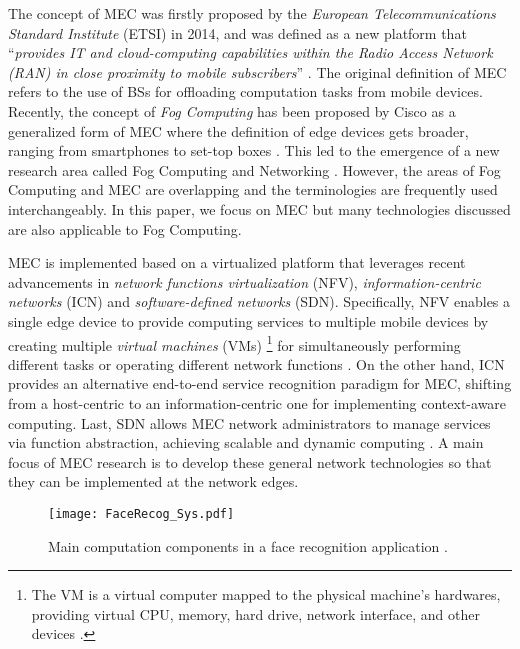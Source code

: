 \documentclass[journal]{IEEEtran}
\begin{document}
The concept of MEC was firstly proposed by the \emph{European Telecommunications Standard Institute} (ETSI) in 2014, and was defined as a new platform that ``\emph{provides IT and cloud-computing capabilities within the Radio Access Network (RAN) in close proximity to mobile subscribers}'' \cite{ETSI14}.  The original definition of MEC refers to the use of BSs for offloading computation tasks from mobile devices. Recently, the concept of \emph{Fog Computing} has been proposed by Cisco as a generalized form of MEC where the definition of edge devices gets broader, ranging from  smartphones to set-top boxes \cite{bonomi2012fog}.  This led to the emergence of a new research area called Fog Computing and Networking \cite{yi2015survey,chiangfog,klas2015fog}. However, the  areas of Fog Computing and MEC are overlapping and the terminologies are frequently used interchangeably. In this paper, we focus on MEC but many technologies discussed are also applicable to Fog Computing.

MEC is implemented based on a virtualized platform that leverages recent advancements in \emph{network functions virtualization} (NFV), \emph{information-centric networks} (ICN) and \emph{software-defined networks} (SDN). Specifically, NFV enables a single edge device to provide computing services to multiple mobile devices by creating multiple \emph{virtual machines} (VMs) \footnote{The VM is a virtual computer mapped to the physical machine's hardwares, providing virtual CPU, memory, hard drive, network interface, and other devices \cite{goldberg1974survey}. } for simultaneously performing different tasks or operating different network functions \cite{hu2015mobile}. On the other hand, ICN provides an alternative end-to-end service recognition paradigm for MEC, shifting from a host-centric to an information-centric one for implementing  context-aware computing. Last, SDN allows MEC network administrators to manage services via function abstraction, achieving scalable and dynamic computing \cite{chang2016mec}. A main focus of MEC research is to develop these general network technologies so that they can be implemented at the network edges.

\begin{figure}[!t]
\begin{center}
   \texttt{[image: FaceRecog\_Sys.pdf]}
\end{center}
\caption{Main computation components in a face recognition application \cite{Jaber1405}. }
\label{FaceRecognition}
\end{figure}
\end{document}
